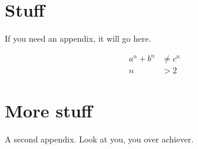\documentclass[letterpaper,12pt,draft]{yalephd}
\begin{document}




\appendix

\chapter{Stuff}
If you need an appendix, it will go here.

\begin{align}
a^n + b^n &\ne c^n \\
n &> 2
\end{align}

\chapter{More stuff}
A second appendix. Look at you, you over achiever.

\backmatter


\end{document}
